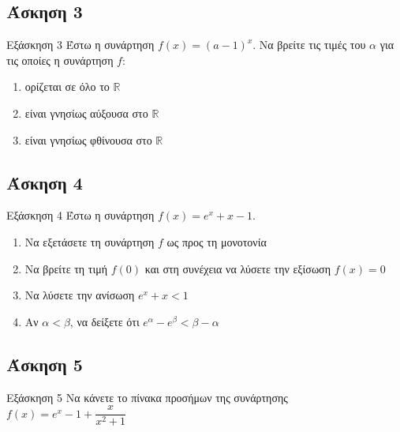 \documentclass[greek]{beamer}
\begin{document}
\subsection{Άσκηση 3}
\begin{frame}[label=Άσκηση3,t]{Εξάσκηση 3}
 Έστω η συνάρτηση $f(x)=(a-1)^x$. Να βρείτε τις τιμές του $α$ για τις οποίες η συνάρτηση $f$:
 \begin{enumerate}
  \item<1-> ορίζεται σε όλο το $\mathbb{R}$
  \item<2-> είναι γνησίως αύξουσα στο $\mathbb{R}$
  \item<3-> είναι γνησίως φθίνουσα στο $\mathbb{R}$
 \end{enumerate}

\end{frame}

\subsection{Άσκηση 4}
\begin{frame}[label=Άσκηση4,t]{Εξάσκηση 4}
 Έστω η συνάρτηση $f(x)=e^x+x-1$.
 \begin{enumerate}
  \item<1-> Να εξετάσετε τη συνάρτηση $f$ ως προς τη μονοτονία
  \item<2-> Να βρείτε τη τιμή $f(0)$ και στη συνέχεια να λύσετε την εξίσωση $f(x)=0$
  \item<3-> Να λύσετε την ανίσωση $e^x+x<1$
  \item<4-> Αν $α<β$, να δείξετε ότι $e^α-e^β<β-α$
 \end{enumerate}

\end{frame}

\subsection{Άσκηση 5}
\begin{frame}[label=Άσκηση5,t]{Εξάσκηση 5}
 Να κάνετε το πίνακα προσήμων της συνάρτησης $f(x)=e^x-1+\dfrac{x}{x^2+1}$

\end{frame}
\end{document}
